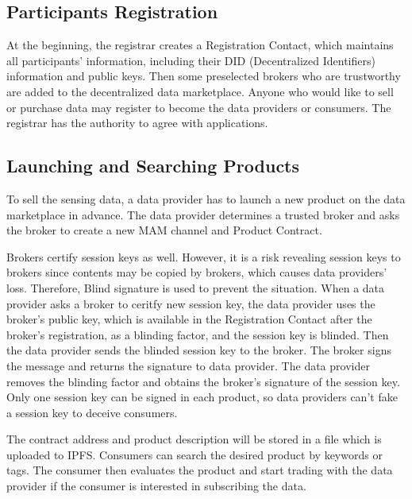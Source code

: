 \documentclass[journal,a4paper]{IEEEtran}
\begin{document}
\subsection{Participants Registration}
At the beginning, the registrar creates a Registration Contact, which maintains all participants' information, including their DID (Decentralized Identifiers) information and public keys. Then some preselected brokers who are trustworthy are added to the decentralized data marketplace. Anyone who would like to sell or purchase data may register to become the data providers or consumers. The registrar has the authority to agree with applications.

\subsection{Launching and Searching Products}
To sell the sensing data, a data provider has to launch a new product on the data marketplace in advance. The data provider determines a trusted broker and asks the broker to create a new MAM channel and Product Contract.

Brokers certify session keys as well. However, it is a risk revealing session keys to brokers since contents may be copied by brokers, which causes data providers' loss. Therefore, Blind signature is used to prevent the situation. When a data provider asks a broker to ceritfy new session key, the data provider uses the broker's public key, which is available in the Registration Contact after the broker's registration, as a blinding factor, and the session key is blinded. Then the data provider sends the blinded session key to the broker. The broker signs the message and returns the signature to data provider. The data provider removes the blinding factor and obtains the broker's signature of the session key. Only one session key can be signed in each product, so data providers can't fake a session key to deceive consumers.

The contract address and product description will be stored in a file which is uploaded to IPFS. Consumers can search the desired product by keywords or tags. The consumer then evaluates the product and start trading with the data provider if the consumer is interested in subscribing the data.
\end{document}

